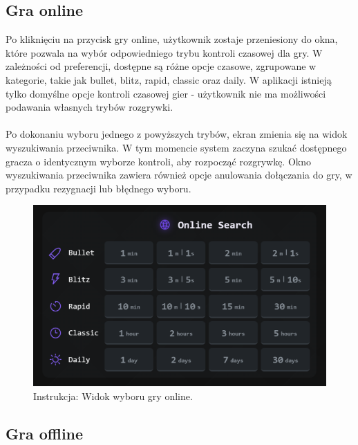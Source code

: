 \documentclass[twoside]{projektInzynierskiMS1}
\begin{document}
\newpage

\subsection{Gra online}

\noindent
Po kliknięciu na przycisk gry online, użytkownik zostaje przeniesiony do okna, które pozwala na wybór odpowiedniego trybu kontroli czasowej dla gry. W zależności od preferencji, dostępne są różne opcje czasowe, zgrupowane w kategorie, takie jak bullet, blitz, rapid, classic oraz daily. W aplikacji istnieją tylko domyślne opcje kontroli czasowej gier - użytkownik nie ma możliwości podawania własnych trybów rozgrywki. 
\\\\
Po dokonaniu wyboru jednego z powyższych trybów, ekran zmienia się na widok wyszukiwania przeciwnika. W tym momencie system zaczyna szukać dostępnego gracza o identycznym wyborze kontroli, aby rozpocząć rozgrywkę. Okno wyszukiwania przeciwnika zawiera również opcje anulowania dołączania do gry, w przypadku rezygnacji lub błędnego wyboru.

\vspace{0.5cm}
\begin{figure}[h!]
    \centering
    \includegraphics[width=1\textwidth]{images/ins_min_pvp.png}
    \caption{Instrukcja: Widok wyboru gry online.}
\end{figure}

\newpage

\subsection{Gra offline}
\end{document}
